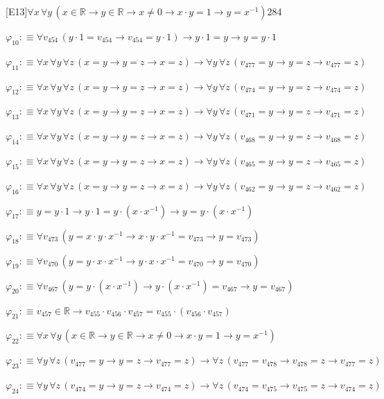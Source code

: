 \begin{fullproof}{[E13]}{$\forall x\,\forall y\,(x \in \mathbb{R} \to y \in \mathbb{R} \to x \neq 0 \to x \cdot y = 1 \to y = x^{-1})$}{284}
\begin{abbrevlist}
\item $\varphi_{10} :\equiv \forall v_{454}\,(y \cdot 1 = v_{454} \to v_{454} = y \cdot 1) \to y \cdot 1 = y \to y = y \cdot 1$
\item $\varphi_{11} :\equiv \forall x\,\forall y\,\forall z\,(x = y \to y = z \to x = z) \to \forall y\,\forall z\,(v_{477} = y \to y = z \to v_{477} = z)$
\item $\varphi_{12} :\equiv \forall x\,\forall y\,\forall z\,(x = y \to y = z \to x = z) \to \forall y\,\forall z\,(v_{474} = y \to y = z \to v_{474} = z)$
\item $\varphi_{13} :\equiv \forall x\,\forall y\,\forall z\,(x = y \to y = z \to x = z) \to \forall y\,\forall z\,(v_{471} = y \to y = z \to v_{471} = z)$
\item $\varphi_{14} :\equiv \forall x\,\forall y\,\forall z\,(x = y \to y = z \to x = z) \to \forall y\,\forall z\,(v_{468} = y \to y = z \to v_{468} = z)$
\item $\varphi_{15} :\equiv \forall x\,\forall y\,\forall z\,(x = y \to y = z \to x = z) \to \forall y\,\forall z\,(v_{465} = y \to y = z \to v_{465} = z)$
\item $\varphi_{16} :\equiv \forall x\,\forall y\,\forall z\,(x = y \to y = z \to x = z) \to \forall y\,\forall z\,(v_{462} = y \to y = z \to v_{462} = z)$
\item $\varphi_{17} :\equiv y = y \cdot 1 \to y \cdot 1 = y \cdot (x \cdot x^{-1}) \to y = y \cdot (x \cdot x^{-1})$
\item $\varphi_{18} :\equiv \forall v_{473}\,(y = x \cdot y \cdot x^{-1} \to x \cdot y \cdot x^{-1} = v_{473} \to y = v_{473})$
\item $\varphi_{19} :\equiv \forall v_{470}\,(y = y \cdot x \cdot x^{-1} \to y \cdot x \cdot x^{-1} = v_{470} \to y = v_{470})$
\item $\varphi_{20} :\equiv \forall v_{467}\,(y = y \cdot (x \cdot x^{-1}) \to y \cdot (x \cdot x^{-1}) = v_{467} \to y = v_{467})$
\item $\varphi_{21} :\equiv v_{457} \in \mathbb{R} \to v_{455} \cdot v_{456} \cdot v_{457} = v_{455} \cdot (v_{456} \cdot v_{457})$
\item $\varphi_{22} :\equiv \forall x\,\forall y\,(x \in \mathbb{R} \to y \in \mathbb{R} \to x \neq 0 \to x \cdot y = 1 \to y = x^{-1})$
\item $\varphi_{23} :\equiv \forall y\,\forall z\,(v_{477} = y \to y = z \to v_{477} = z) \to \forall z\,(v_{477} = v_{478} \to v_{478} = z \to v_{477} = z)$
\item $\varphi_{24} :\equiv \forall y\,\forall z\,(v_{474} = y \to y = z \to v_{474} = z) \to \forall z\,(v_{474} = v_{475} \to v_{475} = z \to v_{474} = z)$

\end{abbrevlist}
\end{fullproof}
